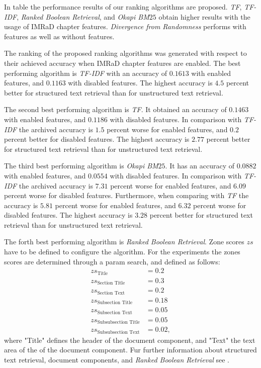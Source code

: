 In table  the performance results of our ranking algorithms are proposed. \textit{TF}, \textit{TF-IDF}, \textit{Ranked Boolean Retrieval}, and \textit{Okapi BM$25$} obtain higher results with the usage of IMRaD chapter features. \textit{Divergence from Randomness} performs with features as well as without features.

The ranking of the proposed ranking algorithms was generated with respect to their achieved accuracy when IMRaD chapter features are enabled.  The best performing algorithm is \textit{TF-IDF} with an accuracy of $0.1613$ with enabled features, and $0.1163$ with disabled features. The highest accuracy is $4.5$ percent better for structured text retrieval than for unstructured text retrieval.

The second best performing algorithm is \textit{TF}. It obtained an accuracy of $0.1463$ with enabled features, and $0.1186$ with disabled features. In comparison with \textit{TF-IDF} the archived accuracy is $1.5$ percent worse for enabled features, and $0.2$ percent better for disabled features. The highest accuracy is $2.77$ percent better for structured text retrieval than for unstructured text retrieval.

The third best performing algorithm is \textit{Okapi BM$25$}. It has an accuracy of $0.0882$ with enabled features, and $0.0554$ with disabled features. In comparison with \textit{TF-IDF} the archived accuracy is $7.31$ percent worse for enabled features, and $6.09$ percent worse for disabled features. Furthermore, when comparing with \textit{TF} the accuracy is $5.81$ percent worse for enabled features, and $6.32$ percent worse for disabled features. The highest accuracy is $3.28$ percent better for structured text retrieval than for unstructured text retrieval.

The forth best performing algorithm is \textit{Ranked Boolean Retrieval}. Zone scores $zs$ have to be defined to configure the algorithm. For the experiments the zones scores are determined through a param search, and defined as follows:
\begin{align*}
  zs_{\text{Title}} & = 0.2                \nonumber \\
  zs_{\text{Section Title}} & = 0.3        \nonumber \\
  zs_{\text{Section Text}} & = 0.2         \nonumber \\
  zs_{\text{Subsection Title}} & = 0.18    \nonumber \\
  zs_{\text{Subsection Text}} & = 0.05     \nonumber \\
  zs_{\text{Subsubsection Title}} & =0.05  \nonumber \\
  zs_{\text{Subsubsection Text}} & = 0.02, \nonumber
\end{align*}
where "Title" defines the header of the document component, and "Text" the text area of the of the document component. Fur further information about structured text retrieval, document components, and \textit{Ranked Boolean Retrieval} see . 

